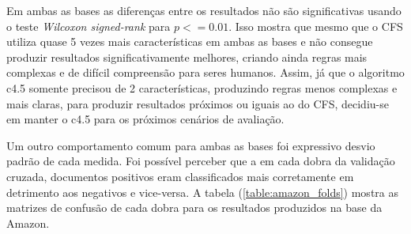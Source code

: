 \documentclass[template.tex]{subfiles}
\begin{document}
%

%
%

Em ambas as bases as diferenças entre os resultados não são significativas usando o teste \textit{Wilcoxon signed-rank} para $p <= 0.01$. Isso mostra que mesmo que o CFS utiliza quase 5 vezes mais características em ambas as bases e não consegue produzir resultados significativamente melhores, criando ainda regras mais complexas e de difícil compreensão para seres humanos. Assim, já que o algoritmo c4.5 somente precisou de 2 características, produzindo regras menos complexas e mais claras, para produzir resultados próximos ou iguais ao do CFS, decidiu-se em manter o c4.5 para os próximos cenários de avaliação. 

Um outro comportamento comum para ambas as bases foi expressivo desvio padrão de cada medida. Foi possível perceber que a em cada dobra da validação cruzada, documentos positivos eram classificados mais corretamente em detrimento aos negativos e vice-versa. A tabela (\ref{table:amazon_folds}) mostra as matrizes de confusão de cada dobra para os resultados produzidos na base da Amazon. 
\end{document}
